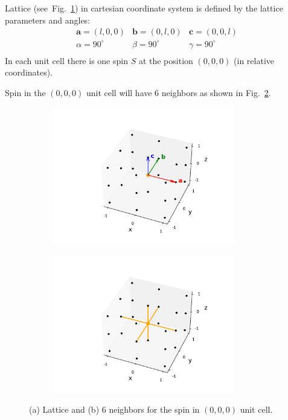 \documentclass[a4paper,12pt]{article}
\begin{document}
        Lattice (see~Fig.~\ref{fig:lattice}) in cartesian coordinate system is defined by the lattice parameters and angles:
        \begin{equation}
            \begin{matrix}
                \mathbf{a} = (l, 0, 0) & \mathbf{b} = (0, l, 0) & \mathbf{c} = (0, 0, l) \\
                \alpha = 90^{\circ} & \beta = 90^{\circ} & \gamma = 90^{\circ} \\
            \end{matrix}
        \end{equation}
        In each unit cell there is one spin $S$ at the position $(0, 0, 0)$ (in relative coordinates).

        Spin in the $(0, 0, 0)$ unit cell will have 6 neighbors as shown in Fig.~\ref{fig:lattice-neighbors}.

        \begin{figure}[H]
            \centering
            \begin{subfigure}[b]{0.49\textwidth}
                \centering
                \includegraphics[height=6cm]{lattice.pdf}
                \caption{}
            \label{fig:lattice}
            \end{subfigure}
            \hfill
            \begin{subfigure}[b]{0.49\textwidth}
                \centering
                \includegraphics[height=6cm]{lattice-neighbors.pdf}
            \caption{}
            \label{fig:lattice-neighbors}
            \end{subfigure}
            \hfill
            \caption{(a) Lattice and (b) 6 neighbors for the spin in $(0, 0, 0)$ unit cell.}
            \label{fig:lattice-both}
        \end{figure}
\end{document}
